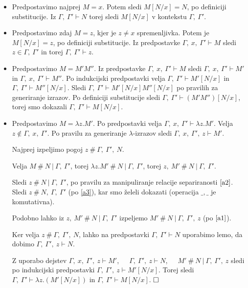 \documentclass{article}
\def\qed{$\hfill\Box$}   %
\begin{document}
\begin{itemize}
\item Predpostavimo najprej \(M = x\). Potem sledi \(M[N/x] = N\), po definiciji substitucije. Iz \(\Gamma,\ \Gamma' \vdash N\) torej sledi \(M[N/x]\) v kontekstu \(\Gamma,\ \Gamma'\).

\item Predpostavimo zdaj \(M = z\), kjer je \(z \neq x\) spremenljivka. Potem je \(M[N/x] = z\), po definiciji substitucije. Iz predpostavke \(\Gamma,\ x,\ \Gamma' \vdash M\) sledi \(z \in \Gamma,\ \Gamma'\) in torej \(\Gamma,\ \Gamma' \vdash z\).

\item Predpostavimo \(M = M' M''\). Iz predpostavke \(\Gamma,\ x,\ \Gamma' \vdash M\) sledi \(\Gamma,\ x,\ \Gamma' \vdash M'\) in \(\Gamma,\ x,\ \Gamma' \vdash M''\). Po indukcijski predpostavki velja \(\Gamma,\ \Gamma' \vdash M'[N/x]\) in \(\Gamma,\ \Gamma' \vdash M''[N/x]\). Sledi \(\Gamma,\ \Gamma' \vdash M'[N/x] M''[N/x]\) po pravilih za generiranje izrazov. Po definiciji substitucije sledi \(\Gamma,\ \Gamma' \vdash (M' M'')[N/x]\), torej smo dokazali \(\Gamma,\ \Gamma' \vdash M[N/x]\).

\item Predpostavimo \(M = \lambda z. M'\). Po predpostavki velja \(\Gamma,\ x,\ \Gamma' \vdash \lambda z. M'\). Velja \(z \notin \Gamma,\ x,\ \Gamma'\). Po pravilu za generiranje \(\lambda\)-izrazov sledi \(\Gamma,\ x,\ \Gamma',\ z \vdash M'\).

Najprej izpeljimo pogoj \(z \ \#\ \Gamma,\ \Gamma',\ N\).

Velja \(M \ \#\  N \ \vert\  \Gamma,\ \Gamma'\), torej \(\lambda z. M' \ \#\  N \ \vert\  \Gamma,\ \Gamma'\), torej \(z,\ M' \ \#\  N \ \vert\  \Gamma,\ \Gamma'\).

Sledi \(z \ \#\  N \ \vert\  \Gamma,\ \Gamma'\), po pravilu za manipuliranje relacije separiranosti \(\ref{a2}\). Sledi \(z \ \#\  N,\ \Gamma,\ \Gamma'\) (po \ref{a3}), kar smo želeli dokazati (operacija \(\_,\_\) je komutativna).

Podobno lahko iz \(z,\ M' \ \#\  N \ \vert\  \Gamma,\ \Gamma'\) izpeljemo \(M' \ \#\  N \ \vert\  \Gamma,\ \Gamma',\ z\) (po \(\ref{a1}\)).

Ker velja \(z \ \#\  \Gamma,\ \Gamma',\ N\), lahko na predpostavki \(\Gamma,\ \Gamma' \vdash N\) uporabimo lemo, da dobimo \(\Gamma,\ \Gamma',\ z \vdash N\).

Z uporabo dejstev \(\Gamma,\ x,\ \Gamma',\ z \vdash M'\),\ \ \  \(\Gamma,\ \Gamma',\ z \vdash N\),\ \ \ \(M' \ \#\  N \ \vert\  \Gamma,\ \Gamma',\ z\) sledi po indukcijski predpostavki \(\Gamma,\ \Gamma',\ z \vdash M'[N/x]\). Torej sledi \(\Gamma,\ \Gamma' \vdash \lambda z. (M'[N/x])\) in \(\Gamma,\ \Gamma' \vdash M[N/x]\). \qed

\end{itemize}
\end{document}
